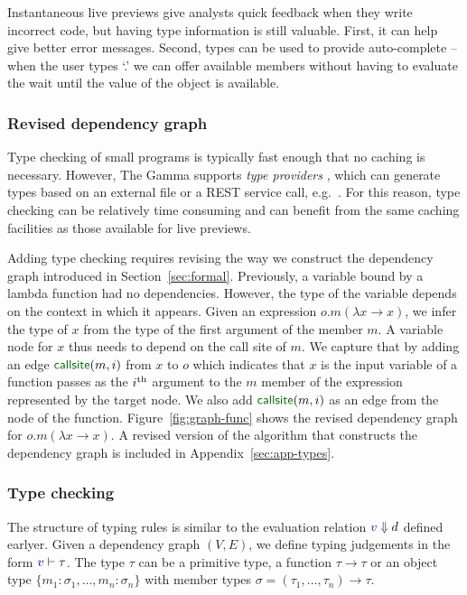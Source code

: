 \documentclass[acmsmall,anonymous,fleqn]{acmart}\settopmatter{printfolios=false,printccs=false,printacmref=false}
\theoremstyle{plain}
\theoremstyle{definition}
\newcommand{\bndclr}[1]{\textcolor{kvdclr}{#1}}
\newcommand{\blbl}[1]{\textnormal{\textcolor{numclr}{\sffamily #1}}}
\begin{document}
Instantaneous live previews give analysts quick feedback when they write incorrect code, but
having type information is still valuable. First, it can help give better error messages. Second,
types can be used to provide auto-complete -- when the user types `.' we can offer available
members without having to evaluate the wait until the value of the object is available.

\subsubsection{Revised dependency graph}
Type checking of small programs is typically fast enough that no caching is necessary. However,
The Gamma supports \emph{type providers} \cite{providers-fsharp,providers-idris}, which can
generate types based on an external file or a REST service call, e.g.~\cite{fsdata}. For this
reason, type checking can be relatively time consuming and can benefit from the same caching
facilities as those available for live previews.

Adding type checking requires revising the way we construct the dependency graph introduced in
Section~\ref{sec:formal}. Previously, a variable bound by a lambda function had no dependencies.
However, the type of the variable depends on the context in which it appears. Given an expression
$o.m(\lambda x\rightarrow x)$, we infer the type of $x$ from the type of the first argument
of the member $m$. A variable node for $x$ thus needs to depend on the call site of $m$.
We capture that by adding an edge $\blbl{callsite}(m, i)$ from $x$ to $o$ which indicates that
$x$ is the input variable of a function passes as the $i^\textnormal{th}$ argument to the $m$
member of the expression represented by the target node. We also add $\blbl{callsite}(m, i)$
as an edge from the node of the function. Figure~\ref{fig:graph-func} shows the
revised dependency graph for $o.m(\lambda x\rightarrow x)$. A revised version of the algorithm
that constructs the dependency graph is included in Appendix~\ref{sec:app-types}.

\subsubsection{Type checking}
The structure of typing rules is similar to the evaluation relation $\bndclr{v}\Downarrow d$
defined earlyer. Given a dependency graph $(V, E)$, we define typing judgements in the form
$\bndclr{v}\vdash \tau$. The type $\tau$ can be a primitive type, a function $\tau \rightarrow \tau$
or an object type $\{m_1\!:\!\sigma_1, \ldots, m_n\!:\!\sigma_n\}$ with member types
$\sigma = (\tau_1, \ldots, \tau_n) \rightarrow \tau$.
\end{document}
